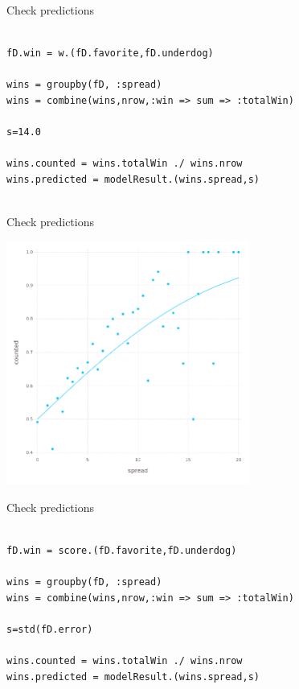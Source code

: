 \documentclass{beamer}
\begin{document}
\begin{frame}[fragile]{Check predictions}
  \begin{lstlisting}

fD.win = w.(fD.favorite,fD.underdog)

wins = groupby(fD, :spread)
wins = combine(wins,nrow,:win => sum => :totalWin)

s=14.0

wins.counted = wins.totalWin ./ wins.nrow
wins.predicted = modelResult.(wins.spread,s)
    
\end{lstlisting}
\end{frame}


\begin{frame}{Check predictions}
  \begin{center}
    \includegraphics[width=8cm]{prediction.png}
\end{center}
  \end{frame}


\begin{frame}[fragile]{Check predictions}
  \begin{lstlisting}

fD.win = score.(fD.favorite,fD.underdog)

wins = groupby(fD, :spread)
wins = combine(wins,nrow,:win => sum => :totalWin)

s=std(fD.error)

wins.counted = wins.totalWin ./ wins.nrow
wins.predicted = modelResult.(wins.spread,s)
    
\end{lstlisting}
\end{frame}
\end{document}
